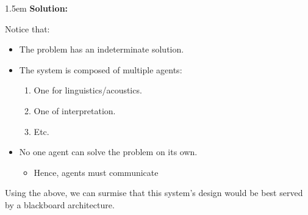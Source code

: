 \documentclass{article}
\newenvironment{solution}{
	\vspace{.5em}
	\par
	\begin{adjustwidth}{1.5em}{}
	\textbf{{Solution:}}
	\par
	\vspace{.5em}
}{
	\vspace{1em}
	\end{adjustwidth}
}
\begin{document}
\begin{solution}
	Notice that:
	\begin{itemize}
		\item The problem has an indeterminate solution.
		\item The system is composed of multiple agents:
		\begin{enumerate}
			\item One for linguistics/acoustics.
			\item One of interpretation.
			\item Etc.
		\end{enumerate}
		\item No one agent can solve the problem on its own.
		\begin{itemize}
			\item Hence, agents must communicate
		\end{itemize}
	\end{itemize}

	Using the above, we can surmise that this system's design would be best served by a blackboard architecture.
\end{solution}
\end{document}
